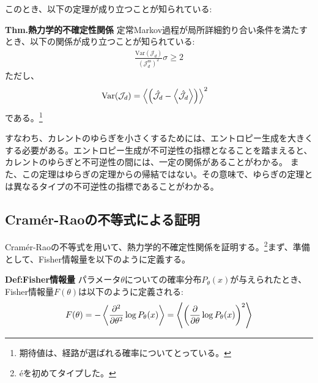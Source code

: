 \documentclass[a4paper,11pt]{jsarticle}
\numberwithin{equation}{section}
\begin{document}
このとき、以下の定理が成り立つことが知られている:

\begin{itembox}[l]{\textbf{Thm.熱力学的不確定性関係}}
    定常Markov過程が局所詳細釣り合い条件を満たすとき、以下の関係が成り立つことが知られている:
    \begin{align}
        \frac{\text{Var}(\mathcal{J}_d)}{(\mathcal{J}_d^{\text{ss}})^2} \sigma \geq 2
    \end{align}
    ただし、
    \begin{align}
        \text{Var}(\mathcal{J}_d) &= \ev{\qty(\hat{\mathcal{J}}_d -\ev{\hat{\mathcal{J}_d}})}^2
    \end{align}
    である。\footnote{期待値は、経路が選ばれる確率についてとっている。}
\end{itembox}
すなわち、カレントのゆらぎを小さくするためには、エントロピー生成を大きくする必要がある。エントロピー生成が不可逆性の指標となることを踏まえると、カレントのゆらぎと不可逆性の間には、一定の関係があることがわかる。
また、この定理はゆらぎの定理からの帰結ではない。その意味で、ゆらぎの定理とは異なるタイプの不可逆性の指標であることがわかる。

\subsection{Cram\'er-Raoの不等式による証明}
Cram\'er-Raoの不等式を用いて、熱力学的不確定性関係を証明する。\footnote{\'eを初めてタイプした。}まず、準備として、Fisher情報量を以下のように定義する。
\begin{itembox}[l]{\textbf{Def:Fisher情報量}}
    パラメータ$\theta$についての確率分布$P_{\theta}(x)$が与えられたとき、Fisher情報量$F(\theta)$は以下のように定義される:
    \begin{align}
        F(\theta) = -\ev{\pdv[2]{\theta} \log P_{\theta}(x)} =\ev{\qty(\pdv{\theta} \log P_{\theta}(x))^2}
    \end{align}
\end{itembox}
\end{document}
